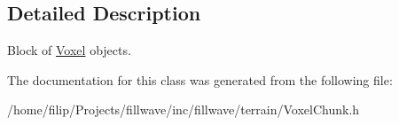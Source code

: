 \subsection{Detailed Description}
Block of \hyperlink{classfillwave_1_1terrain_1_1Voxel}{Voxel} objects. 

The documentation for this class was generated from the following file\+:\begin{DoxyCompactItemize}
\item 
/home/filip/\+Projects/fillwave/inc/fillwave/terrain/Voxel\+Chunk.\+h\end{DoxyCompactItemize}

